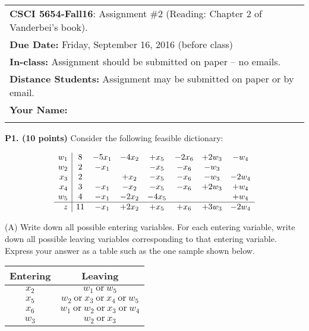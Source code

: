 \documentclass[11pt]{article}
\begin{document}
\begin{tabular}{l}
\textbf{CSCI 5654-Fall16}: Assignment \#2 (Reading: Chapter 2 of Vanderbei's book). \\
\textbf{Due Date:} Friday,  September 16, 2016 (before class) \\
\textbf{In-class:} Assignment should be submitted on paper -- no emails. \\
  \textbf{Distance Students:} Assignment may be submitted on paper or
  by email. \\[10pt]

\textbf{Your Name:} \phantom{Andrew Candelaresi}\\
\hline
\\[10pt]
\end{tabular}

\textbf{P1. (10 points)} Consider the following feasible dictionary:

\[ \begin{array}{r| c c c c c c c}
w_1 & 8 & - 5 x_1 & - 4 x_2 & + x_5 & - 2 x_6 & + 2 w_3 & - w_ 4\\
w_2 & 2 & - x_1 &    &  - x_5 &  - x_6 & - w_3 & \\
x_3 & 2 &         & + x_2 & - x_5 & - x_6 & - w_3 & - 2 w_4 \\
x_4 & 3 & - x_1 & - x_2 & - x_5 & - x_6 & + 2 w_3 & + w_4 \\ 
w_5 & 4 & - x_1 & - 2 x_2 & - 4 x_5 &  &  & + w_4 \\
\hline
z &    11 &  - x_1 &  + 2 x_2 & + x_5 & + x_6 & + 3w_3 & - 2 w_4 \\
\end{array}\]


\noindent (A) Write down all possible entering variables. For each
entering variable, write down all possible leaving variables
corresponding to that entering variable. Express your answer as a
table such as the one sample shown below.


\begin{center}
\begin{tabular}{|c|c|}
\hline
Entering & Leaving \\
\hline
$x_2$ & $w_1\ \mbox{or}\ w_5$ \\
\hline
$x_5$ & $w_2\ \mbox{or}\ x_3\ \mbox{or}\ x_4\ \mbox{or}\ w_5$\\
\hline
$x_6$ & $w_1\ \mbox{or}\ w_2\ \mbox{or}\ x_3\ \mbox{or}\ w_4$\\
\hline
$w_3$ & $w_2\ \mbox{or}\ x_3$\\
\hline
\end{tabular}

\end{center}
\end{document}
